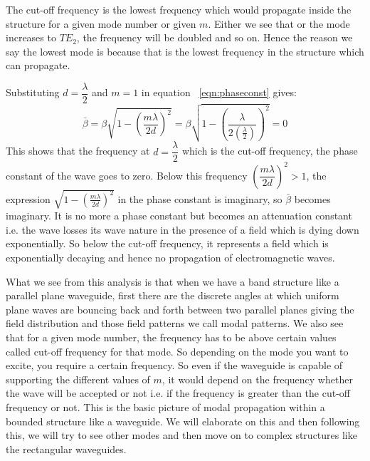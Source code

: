 The cut-off frequency is the lowest frequency which would propagate inside the structure for a given mode number or given $m$. Either we see that or the mode increases to $TE_2$, the frequency will be doubled and so on. Hence the reason we say the lowest mode is because that is the lowest frequency in the structure which can propagate.

Substituting $d=\dfrac{\lambda}{2}$ and $m=1$ in equation ~\ref{eqn:phaseconst} gives:
\begin{dmath*}
\bar{\beta} = \beta\sqrt{1 - \left(\frac{m\lambda}{2d}\right)^2} =  \beta\sqrt{1 - \left(\frac{\lambda}{2\left(\frac{\lambda}{2}\right)}\right)^2} = 0
\end{dmath*}
This shows that the frequency at $d=\dfrac{\lambda}{2}$ which is the cut-off frequency, the phase constant of the wave goes to zero. Below this frequency $\left(\dfrac{m\lambda}{2d}\right)^2 > 1$, the expression $\sqrt{1 - \left(\frac{m\lambda}{2d}\right)^2}$ in the phase constant is imaginary, so $\bar{\beta}$ becomes imaginary. It is no more a phase constant but becomes an attenuation constant i.e. the wave losses its wave nature in the presence of a field which is dying down exponentially. So below the cut-off frequency, it represents a field which is exponentially decaying and hence no propagation of electromagnetic waves.

What we see from this analysis is that when we have a band structure like a parallel plane waveguide, first there are the discrete angles at which uniform plane waves are bouncing back and forth between two parallel planes giving the field distribution and those field patterns we call modal patterns. We also see that for a given mode number, the frequency has to be above certain values called cut-off frequency for that mode. So depending on the mode you want to excite, you require a certain frequency. So even if the waveguide is capable of supporting the different values of $m$, it would depend on the frequency whether the wave will be accepted or not i.e. if the frequency is greater than the cut-off frequency or not. This is the basic picture of modal propagation within a bounded structure like a waveguide. We will elaborate on this and then following this, we will try to see other modes and then move on to complex structures like the rectangular waveguides.